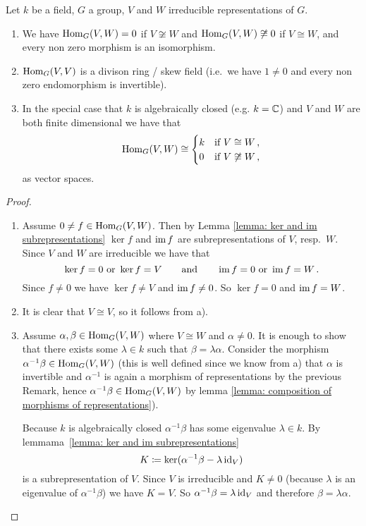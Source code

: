 \begin{lemma}
  Let $k$ be a field, $G$ a group, $V$ and $W$ irreducible representations of $G$.
  \begin{enumerate}[label=\emph{\alph*)},leftmargin=*]
    \item
      We have $\operatorname{Hom}_G(V,W) = 0$ if $V \not\cong W$ and $\operatorname{Hom}_G(V,W) \not\cong 0$ if $V \cong W$, and every non zero morphism is an isomorphism.
    \item
      $\operatorname{Hom}_G(V,V)$ is a divison ring / skew field (i.e.\ we have $1 \neq 0$ and every non zero endomorphism is invertible).
    \item
      In the special case that $k$ is algebraically closed (e.g. $k = \mathbb{C}$) and $V$ and $W$ are both finite dimensional we have that
      \[
              \operatorname{Hom}_G(V,W)
        \cong \begin{cases}
                k & \text{if } V \cong     W \,,  \\
                0 & \text{if } V \not\cong W \,,
              \end{cases}
      \]
      as vector spaces.
  \end{enumerate}
\end{lemma}
\begin{proof}
  \begin{enumerate}[label=\emph{\alph*)},leftmargin=*]
    \item 
      Assume $0 \neq f \in \operatorname{Hom}_G(V,W)$.
      Then by Lemma \ref{lemma: ker and im subrepresentations} $\ker f$ and $\operatorname{im} f$ are subrepresentations of $V$, resp.\ $W$.
      Since $V$ and $W$ are irreducible we have that
      \[
          \ker f = 0
          \text{ or }
          \ker f = V
        \qquad
        \text{and}
        \qquad
          \operatorname{im} f = 0
          \text{ or }
          \operatorname{im} f = W \,.
      \]
      Since $f \neq 0$ we have $\ker f \neq V$ and $\operatorname{im} f \neq 0$.
      So $\ker f = 0$ and $\operatorname{im} f = W$.
    \item
      It is clear that $V \cong V$, so it follows from a).
    \item
      Assume $\alpha, \beta \in \operatorname{Hom}_G(V,W)$ where $V \cong W$ and $\alpha \neq 0$.
      It is enough to show that there exists some $\lambda \in k$ such that $\beta = \lambda \alpha$.
      Consider the morphism $\alpha^{-1} \beta \in \operatorname{Hom}_G(V,W)$ (this is well defined since we know from a) that $\alpha$ is invertible and $\alpha^{-1}$ is again a morphism of representations by the previous Remark, hence $\alpha^{-1} \beta \in \operatorname{Hom}_G(V,W)$ by lemma \ref{lemma: composition of morphisms of representations}).
      
      Because $k$ is algebraically closed $\alpha^{-1} \beta$ has some eigenvalue $\lambda \in k$.
      By \mbox{lemmama \ref{lemma: ker and im subrepresentations}}
      \[
                  K
        \coloneqq \ker(\alpha^{-1} \beta - \lambda \operatorname{id}_V)
      \]
      is a subrepresentation of $V$.
      Since $V$ is irreducible and $K \neq 0$ (because $\lambda$ is an eigenvalue of $\alpha^{-1} \beta$) we have $K = V$.
      So $\alpha^{-1} \beta = \lambda \operatorname{id}_V$ and therefore $\beta = \lambda \alpha$.
    \qedhere
  \end{enumerate}
\end{proof}


